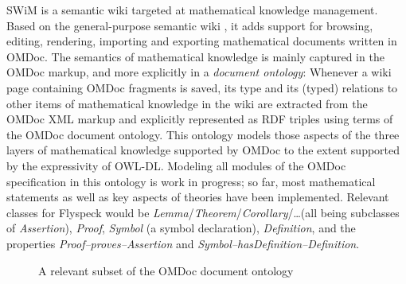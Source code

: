 SWiM is a semantic wiki targeted at mathematical knowledge management.  Based on
the general-purpose semantic wiki
\cite{KrSchVr:semwiki-reasoning07}, it adds support for
browsing, editing, rendering, importing and exporting mathematical documents
written in OMDoc.  The semantics of mathematical knowledge is mainly captured in
the OMDoc markup, and more explicitly in a \emph{document ontology}: Whenever a
wiki page containing OMDoc fragments is saved, its type and its (typed)
relations to other items of mathematical knowledge in the wiki are extracted
from the OMDoc XML markup and explicitly represented as RDF triples using terms
of the OMDoc document ontology\cite{OMDocDocOnto:web}.  This ontology models
those aspects of the three layers of mathematical knowledge supported by OMDoc
to the extent supported by the expressivity of OWL-DL\cite{McGvHa:owl04}.
Modeling all modules of the OMDoc specification in this ontology is work in
progress; so far, most mathematical statements as well as key aspects of
theories have been implemented.  Relevant classes for Flyspeck would be
\textit{Lemma}/\textit{Theorem}/\textit{Corollary}/\ldots (all being subclasses
of \textit{Assertion}), \textit{Proof}, \textit{Symbol} (a symbol declaration),
\textit{Definition}, and the properties \textit{Proof--proves--Assertion} and
\textit{Symbol--hasDefinition--Definition}.

\begin{figure}
  \centering
  \caption{A relevant subset of the OMDoc document ontology}
  \label{fig:doconto}
\end{figure}

